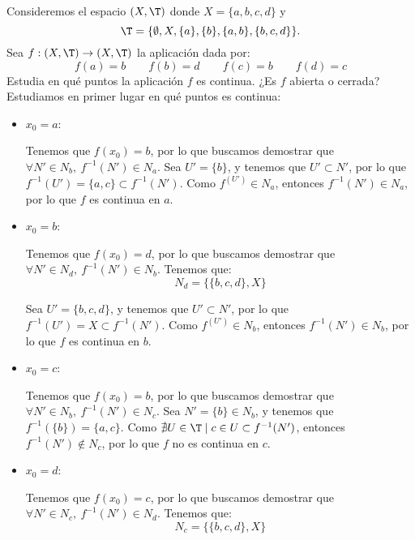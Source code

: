 \begin{ejercicio}
    Consideremos el espacio $(X, \T )$ donde $X = \{a, b, c, d\}$ y
    \begin{equation*}
        \T = \{\emptyset, X, \{a\}, \{b\}, \{a, b\}, \{b, c, d\}\}.
    \end{equation*}
    Sea $f : (X, \T ) \to (X, \T )$ la aplicación dada por: $$f(a) = b\qquad f(b) = d\qquad f(c) = b\qquad f(d) = c$$
    Estudia en qué puntos la aplicación $f$ es continua. ¿Es $f$ abierta o cerrada?\\

    
    Estudiamos en primer lugar en qué puntos es continua:
    \begin{itemize}
        \item $x_0=a$:
        
        Tenemos que $f(x_0)=b$, por lo que buscamos
        demostrar que $\forall N'\in N_b,~ f^{-1}(N')\in N_{a}$. Sea $U'=\{b\}$, y tenemos que
        $U'\subset N'$, por lo que $f^{-1}(U')=\{a,c\}\subset f^{-1}(N')$.
        Como $f^(U')\in N_{a}$, entonces $f^{-1}(N')\in N_{a}$, por lo que $f$ es continua en $a$.

        \item $x_0=b$:
        
        Tenemos que $f(x_0)=d$, por lo que buscamos
        demostrar que $\forall N'\in N_d,~ f^{-1}(N')\in N_{b}$. Tenemos que:
        \begin{equation*}
            N_d = \{\{b,c,d\}, X\}
        \end{equation*}

        Sea $U'=\{b,c,d\}$, y tenemos que $U'\subset N'$, por lo que $f^{-1}(U')=X\subset f^{-1}(N')$.
        Como $f^(U')\in N_{b}$, entonces $f^{-1}(N')\in N_{b}$, por lo que $f$ es continua en $b$.

        \item $x_0=c$:
        
        Tenemos que $f(x_0)=b$, por lo que buscamos
        demostrar que $\forall N'\in N_b,~ f^{-1}(N')\in N_{c}$. Sea $N'=\{b\}\in N_b$, y tenemos que
        $f^{-1}(\{b\})=\{a,c\}$. Como $\nexists U\in \T \mid c\in U\subset f^{-1}(N')$, entonces $f^{-1}(N')\notin N_{c}$, por lo que $f$ no es continua en $c$.

        \item $x_0=d$:
        
        Tenemos que $f(x_0)=c$, por lo que buscamos
        demostrar que $\forall N'\in N_c,~ f^{-1}(N')\in N_{d}$. Tenemos que:
        \begin{equation*}
            N_c = \{\{b,c,d\}, X\}
        \end{equation*}


\end{itemize}
\end{ejercicio}
